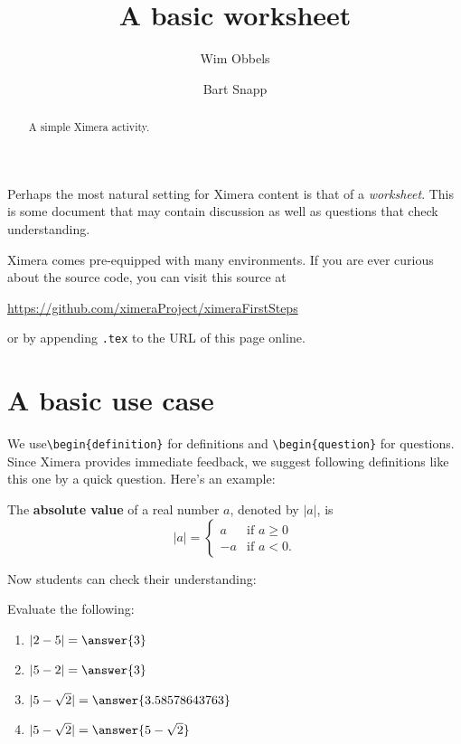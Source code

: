 \documentclass{ximera}
\title{A basic worksheet}
\author{Wim Obbels \and Bart Snapp}
\begin{document}
\begin{abstract}
    A simple Ximera activity.
\end{abstract}
\maketitle
\label{xim:aFirstActivity}

Perhaps the most natural setting for Ximera content is that of a
\textit{worksheet}. This is some document that may contain discussion as well
as questions that check understanding.

Ximera comes pre-equipped with many environments.  If you are ever curious about
the source code, you can visit this source at

\begin{center}
    \url{https://github.com/ximeraProject/ximeraFirstSteps}
\end{center}
or by appending \verb|.tex| to the URL of this page online. 


\section{A basic use case}
We use\verb|\begin{definition}| for definitions and \verb|\begin{question}| for
questions. Since Ximera provides immediate feedback, we suggest following
definitions like this one by a quick question. Here's an example:

\begin{definition}\label{def:absolute_value}
    The \textbf{absolute value} of a real number $a$, denoted by $|a|$, is
    \[
        |a| = \begin{cases}
            a  & \text{if $a \geq 0$} \\
            -a & \text{if $a<0$.}
        \end{cases}
    \]
\end{definition}
Now students can check their understanding:
\begin{question}
    Evaluate the following:
    \begin{enumerate}
        \item $|2-5| = \answer{3}$
        \item $|5-2| = \answer{3}$
        \item $|5-\sqrt{2}| = \answer{3.58578643763}$
        \item $|5-\sqrt{2}| = \answer{5-\sqrt{2}}$
    \end{enumerate}
\end{question}
\end{document}
